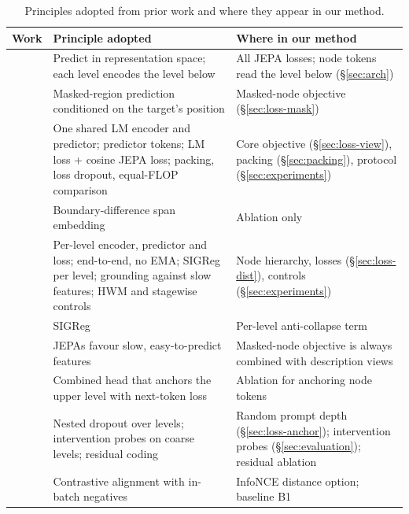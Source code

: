 \documentclass[11pt]{article}
\begin{document}
\begin{table}[t]
\centering
\small
\caption{Principles adopted from prior work and where they appear in our method.}
\label{tab:principles}
\begin{tabularx}{\textwidth}{@{}p{3.2cm}YY@{}}
\toprule
Work & Principle adopted & Where in our method \\
\midrule
\citet{lecun2022path} & Predict in representation space; each level encodes the level below & All JEPA losses; node tokens read the level below (\S\ref{sec:arch}) \\
\citet{assran2023ijepa,bardes2024vjepa} & Masked-region prediction conditioned on the target's position & Masked-node objective (\S\ref{sec:loss-mask}) \\
\citet{huang2025llmjepa} & One shared LM encoder and predictor; predictor tokens; LM loss + cosine JEPA loss; packing, loss dropout, equal-FLOP comparison & Core objective (\S\ref{sec:loss-view}), packing (\S\ref{sec:packing}), protocol (\S\ref{sec:experiments}) \\
\citet{llmjepa2025stp} & Boundary-difference span embedding & Ablation only \\
\citet{zhang2026hjepa} & Per-level encoder, predictor and loss; end-to-end, no EMA; SIGReg per level; grounding against slow features; HWM and stagewise controls & Node hierarchy, losses (\S\ref{sec:loss-dist}), controls (\S\ref{sec:experiments}) \\
\citet{balestriero2025lejepa} & SIGReg & Per-level anti-collapse term \\
\citet{sobal2022slow} & JEPAs favour slow, easy-to-predict features & Masked-node objective is always combined with description views \\
\citet{shi2026hilp} & Combined head that anchors the upper level with next-token loss & Ablation for anchoring node tokens \\
\citet{kumbong2026ncm} & Nested dropout over levels; intervention probes on coarse levels; residual coding & Random prompt depth (\S\ref{sec:loss-anchor}); intervention probes (\S\ref{sec:evaluation}); residual ablation \\
\citet{oord2018cpc,radford2021clip} & Contrastive alignment with in-batch negatives & InfoNCE distance option; baseline B1 \\
\bottomrule
\end{tabularx}
\end{table}

\end{document}
